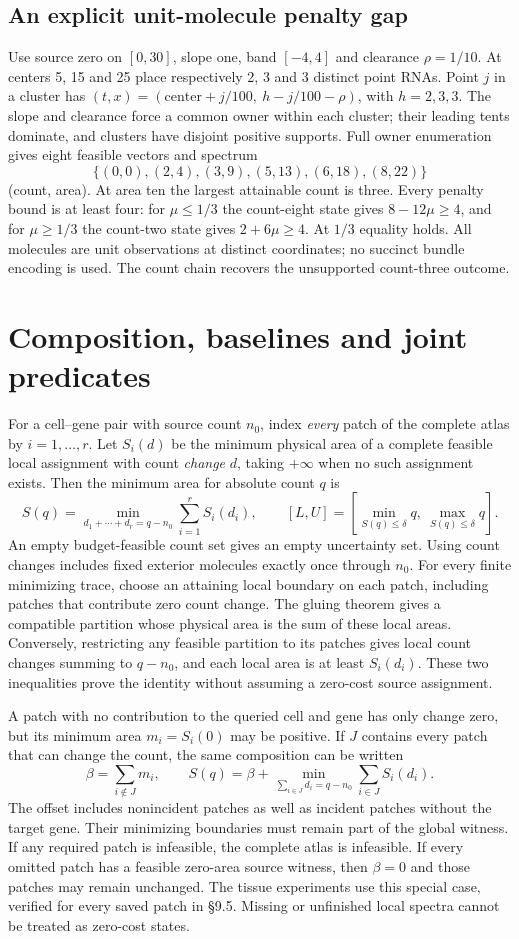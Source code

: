 \documentclass[10pt,letterpaper]{article}
\begin{document}
\subsection{An explicit unit-molecule penalty gap}
Use source zero on $[0,30]$, slope one, band $[-4,4]$ and clearance $\rho=1/10$. At centers 5, 15 and 25 place respectively 2, 3 and 3 distinct point RNAs. Point $j$ in a cluster has $(t,x)=(\text{center}+j/100,\ h-j/100-\rho)$, with $h=2,3,3$. The slope and clearance force a common owner within each cluster; their leading tents dominate, and clusters have disjoint positive supports. Full owner enumeration gives eight feasible vectors and spectrum
\[
 \{(0,0),(2,4),(3,9),(5,13),(6,18),(8,22)\}
\]
(count, area). At area ten the largest attainable count is three. Every penalty bound is at least four: for $\mu\le1/3$ the count-eight state gives $8-12\mu\ge4$, and for $\mu\ge1/3$ the count-two state gives $2+6\mu\ge4$. At $1/3$ equality holds. All molecules are unit observations at distinct coordinates; no succinct bundle encoding is used. The count chain recovers the unsupported count-three outcome.

\section{Composition, baselines and joint predicates}
For a cell--gene pair with source count $n_0$, index \emph{every} patch of the complete atlas by $i=1,\ldots,r$. Let $S_i(d)$ be the minimum physical area of a complete feasible local assignment with count \emph{change} $d$, taking $+\infty$ when no such assignment exists. Then the minimum area for absolute count $q$ is
\[
 S(q)=\min_{d_1+\cdots+d_r=q-n_0}\sum_{i=1}^rS_i(d_i),\qquad
 [L,U]=\left[\min_{S(q)\le\delta}q,\ \max_{S(q)\le\delta}q\right].
\]
An empty budget-feasible count set gives an empty uncertainty set. Using count changes includes fixed exterior molecules exactly once through $n_0$. For every finite minimizing trace, choose an attaining local boundary on each patch, including patches that contribute zero count change. The gluing theorem gives a compatible partition whose physical area is the sum of these local areas. Conversely, restricting any feasible partition to its patches gives local count changes summing to $q-n_0$, and each local area is at least $S_i(d_i)$. These two inequalities prove the identity without assuming a zero-cost source assignment.

A patch with no contribution to the queried cell and gene has only change zero, but its minimum area $m_i=S_i(0)$ may be positive. If $J$ contains every patch that can change the count, the same composition can be written
\[
 \beta=\sum_{i\notin J}m_i,\qquad
 S(q)=\beta+\min_{\sum_{i\in J}d_i=q-n_0}\sum_{i\in J}S_i(d_i).
\]
The offset includes nonincident patches as well as incident patches without the target gene. Their minimizing boundaries must remain part of the global witness. If any required patch is infeasible, the complete atlas is infeasible. If every omitted patch has a feasible zero-area source witness, then $\beta=0$ and those patches may remain unchanged. The tissue experiments use this special case, verified for every saved patch in \S9.5. Missing or unfinished local spectra cannot be treated as zero-cost states.
\end{document}

